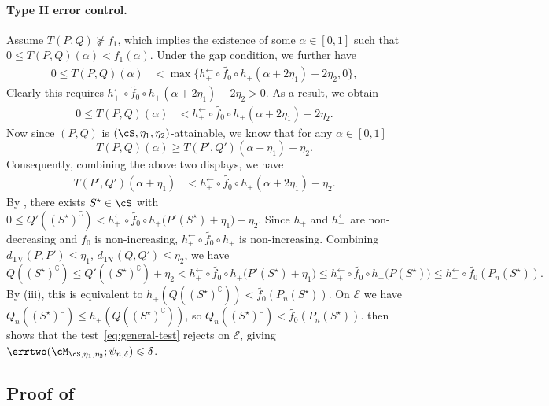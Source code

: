 \documentclass[english]{article}
\theoremstyle{plain}
\theoremstyle{definition}
\newcommand{\hinv}{h_+^{\leftarrow}}
\newcommand{\Toff}[2]{T(#1,#2)}
\newcommand{\fnull}{f_0}
\newcommand{\falt}{f_1}
\newcommand{\hup}{h_+}                             %
\newcommand{\dTV}{d_{\mathrm{TV}}}                 %
\begin{document}
\paragraph{Type II error control.}
Assume $\Toff{P}{Q}\nsucceq\falt$, which implies the existence of some $\alpha \in [0,1]$ such that $0 \leqslant \Toff{P}{Q}(\alpha) < \falt(\alpha)$. 
Under the gap condition, we further have 
\begin{align*}
0 \leqslant \Toff{P}{Q}(\alpha)
&<\max \{ \hinv\circ\widetilde{\fnull}\circ\hup(\alpha+2\eta_1)-2\eta_2,0 \},
\end{align*}
Clearly this requires 
$\hinv\circ\widetilde{\fnull}\circ\hup(\alpha+2\eta_1)-2\eta_2 > 0$. As a result, we obtain 
\begin{align*}
0 \leqslant \Toff{P}{Q}(\alpha)
&< \hinv\circ\widetilde{\fnull}\circ\hup(\alpha+2\eta_1)-2\eta_2.
\end{align*}
Now since $(P,Q)$ is $(\cS,\eta_1,\eta_2)$-attainable, we know that for any $\alpha \in [0,1]$
\[
\Toff{P}{Q}(\alpha)\geqslant \Toff{P'}{Q'}(\alpha+\eta_1)-\eta_2.
\]
Consequently, combining the above two displays, we have 
\begin{align*}
\Toff{P'}{Q'}(\alpha + \eta_1)
&<\hinv\circ\widetilde{\fnull}\circ\hup(\alpha+2\eta_1)-\eta_2.
\end{align*}
By , there exists $S^\star\in\cS$ with $0\leqslant Q'((S^\star)^\complement)<\hinv\circ\widetilde{\fnull}\circ\hup\bigl(P'(S^\star)+\eta_1\bigr)-\eta_2$. Since $\hup$ and $\hinv$ are non-decreasing and $\fnull$ is non-increasing,  $\hinv\circ\widetilde{\fnull}\circ\hup$ is non-increasing. Combining $\dTV(P,P')\leqslant\eta_1$, $\dTV(Q,Q')\leqslant\eta_2$, we have
\[
Q((S^\star)^\complement)
\leqslant Q'((S^\star)^\complement)+\eta_2
<\hinv\circ\widetilde{\fnull}\circ\hup\bigl(P'(S^\star)+\eta_1\bigr)
\leqslant \hinv\circ\widetilde{\fnull}\circ\hup\bigl(P(S^\star)\bigr)\leqslant \hinv\circ\widetilde{\fnull}(P_n(S^\star)).
\]
By (iii), this is equivalent to $\hup(Q((S^\star)^\complement))<\widetilde{\fnull}(P_n(S^\star))$. On $\mathcal E$ we have $Q_n((S^\star)^\complement)\leqslant\hup(Q((S^\star)^\complement))$, so $Q_n((S^\star)^\complement)<\widetilde{\fnull}(P_n(S^\star))$.  then shows that the test~\eqref{eq:general-test} rejects on $\mathcal E$, giving $\errtwo(\cM_{\cS, \eta_1,\eta_2};\psi_{n,\delta})\leqslant\delta$.

\subsection{Proof of }\label{sec:log-concave}
\end{document}
